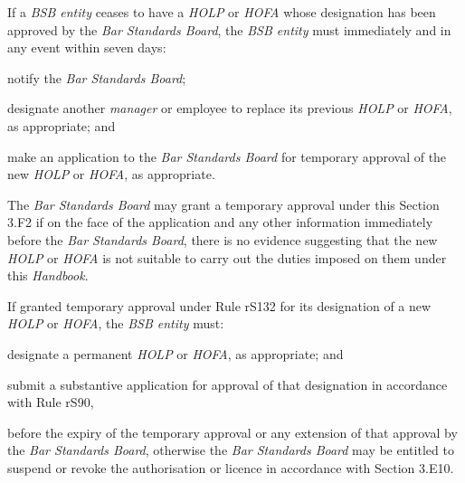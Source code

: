 


If a \emph{BSB entity} ceases to have a \emph{HOLP} or \emph{HOFA} whose
designation has been approved by the \emph{Bar Standards Board}, the
\emph{BSB entity} must immediately and in any event within seven days:\nl\item notify the \emph{Bar Standards Board};
\item designate another \emph{manager} or employee to replace its previous
\emph{HOLP} or \emph{HOFA}, as appropriate; and
\item make an application to the \emph{Bar Standards Board} for temporary
approval of the new \emph{HOLP} or \emph{HOFA}, as appropriate.
\ln
{}

The \emph{Bar Standards Board} may grant a temporary approval under this
Section 3.F2 if on the face of the application and any other information
immediately before the \emph{Bar Standards Board}, there is no evidence
suggesting that the new \emph{HOLP} or \emph{HOFA} is not suitable to
carry out the duties imposed on them under this \emph{Handbook}.


If granted temporary approval under Rule rS132 for its designation of a
new \emph{HOLP} or \emph{HOFA}, the \emph{BSB entity} must:
\begin{numlist}\item designate a permanent \emph{HOLP} or \emph{HOFA}, as appropriate; and
\item submit a substantive application for approval of that designation in
accordance with Rule rS90,
\end{numlist}
before the expiry of the temporary approval or any extension of that
approval by the \emph{Bar Standards Board}, otherwise the \emph{Bar
Standards Board} may be entitled to suspend or revoke the authorisation
or licence in accordance with Section 3.E10.


